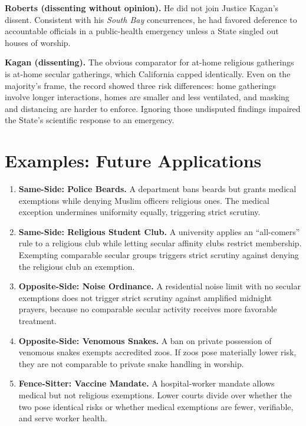 \documentclass[12pt]{article}
\begin{document}
\textbf{Roberts (dissenting without opinion).} He did not join Justice Kagan's dissent. Consistent with his \textit{South Bay} concurrences, he had favored deference to accountable officials in a public-health emergency unless a State singled out houses of worship.

\textbf{Kagan (dissenting).} The obvious comparator for at-home religious gatherings is at-home secular gatherings, which California capped identically. Even on the majority's frame, the record showed three risk differences: home gatherings involve longer interactions, homes are smaller and less ventilated, and masking and distancing are harder to enforce. Ignoring those undisputed findings impaired the State's scientific response to an emergency.

\section{Examples: Future Applications}

\begin{enumerate}
\item \textbf{Same-Side: Police Beards.} A department bans beards but grants medical exemptions while denying Muslim officers religious ones. The medical exception undermines uniformity equally, triggering strict scrutiny.
\item \textbf{Same-Side: Religious Student Club.} A university applies an ``all-comers'' rule to a religious club while letting secular affinity clubs restrict membership. Exempting comparable secular groups triggers strict scrutiny against denying the religious club an exemption.
\item \textbf{Opposite-Side: Noise Ordinance.} A residential noise limit with no secular exemptions does not trigger strict scrutiny against amplified midnight prayers, because no comparable secular activity receives more favorable treatment.
\item \textbf{Opposite-Side: Venomous Snakes.} A ban on private possession of venomous snakes exempts accredited zoos. If zoos pose materially lower risk, they are not comparable to private snake handling in worship.
\item \textbf{Fence-Sitter: Vaccine Mandate.} A hospital-worker mandate allows medical but not religious exemptions. Lower courts divide over whether the two pose identical risks or whether medical exemptions are fewer, verifiable, and serve worker health.
\end{enumerate}
\end{document}
